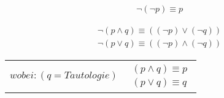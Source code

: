\vspace{-.7cm}

\begin{framed} [Doppelnegation] 
  \begin{equation*}
    \begin{aligned}
      \neg(\neg p) \equiv p 
    \end{aligned}
  \end{equation*}
\end{framed}

\vspace{-.7cm}

\begin{framed}  
  \begin{equation*}
    \begin{aligned}
      \neg(p \wedge q) \equiv ((\neg p)\vee (\neg q)) \\ 
      \neg(p \vee q) \equiv ((\neg p)\wedge (\neg q)) 
    \end{aligned}
  \end{equation*}	
\end{framed}

\vspace{-.7cm}

\begin{framed} [Tautologieregeln] 
  \begin{center}
    \vspace{-.3cm}
    \begin{tabular} {c c}
      \parbox{.5\textwidth}{\begin{equation*}
        wobei: (q = Tautologie)
      \end{equation*}}
      &
      \parbox{3cm}{\begin{equation*}
        \begin{aligned}
          (p \wedge q) \equiv p \\ 
          (p \vee q) \equiv q
        \end{aligned}
      \end{equation*}}
    \end{tabular}
    \vspace{-.3cm}
  \end{center}
\end{framed}

\vspace{-.7cm}

